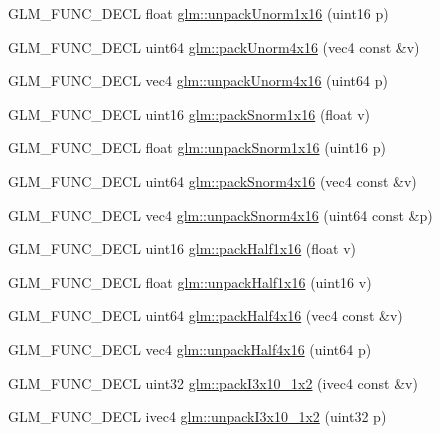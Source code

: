 \begin{DoxyCompactItemize}
G\-L\-M\-\_\-\-F\-U\-N\-C\-\_\-\-D\-E\-C\-L float \hyperlink{group__gtc__packing_ga7770e3ade4f4764cc1b2eb42ac4ec188}{glm\-::unpack\-Unorm1x16} (uint16 p)
\item 
G\-L\-M\-\_\-\-F\-U\-N\-C\-\_\-\-D\-E\-C\-L uint64 \hyperlink{group__gtc__packing_gac561f06c908b7302537a8ef29fcb409e}{glm\-::pack\-Unorm4x16} (vec4 const \&v)
\item 
G\-L\-M\-\_\-\-F\-U\-N\-C\-\_\-\-D\-E\-C\-L vec4 \hyperlink{group__gtc__packing_gafb2b502bc406031a5618ce930139a9e3}{glm\-::unpack\-Unorm4x16} (uint64 p)
\item 
G\-L\-M\-\_\-\-F\-U\-N\-C\-\_\-\-D\-E\-C\-L uint16 \hyperlink{group__gtc__packing_gac29411d6c0f6ed0fe9f0396dfe92e0e8}{glm\-::pack\-Snorm1x16} (float v)
\item 
G\-L\-M\-\_\-\-F\-U\-N\-C\-\_\-\-D\-E\-C\-L float \hyperlink{group__gtc__packing_ga246f451cebf590726324f7a283e3d65e}{glm\-::unpack\-Snorm1x16} (uint16 p)
\item 
G\-L\-M\-\_\-\-F\-U\-N\-C\-\_\-\-D\-E\-C\-L uint64 \hyperlink{group__gtc__packing_ga9b237d7c66b7a71964e6d1f4dc06539f}{glm\-::pack\-Snorm4x16} (vec4 const \&v)
\item 
G\-L\-M\-\_\-\-F\-U\-N\-C\-\_\-\-D\-E\-C\-L vec4 \hyperlink{group__gtc__packing_gadb01fc0530f07beb509c89d97b6f4d20}{glm\-::unpack\-Snorm4x16} (uint64 const \&p)
\item 
G\-L\-M\-\_\-\-F\-U\-N\-C\-\_\-\-D\-E\-C\-L uint16 \hyperlink{group__gtc__packing_gaba534b320836a35372e00af5771dd1a2}{glm\-::pack\-Half1x16} (float v)
\item 
G\-L\-M\-\_\-\-F\-U\-N\-C\-\_\-\-D\-E\-C\-L float \hyperlink{group__gtc__packing_gaa6eebcdfc746584b7d1823f1d5344fed}{glm\-::unpack\-Half1x16} (uint16 v)
\item 
G\-L\-M\-\_\-\-F\-U\-N\-C\-\_\-\-D\-E\-C\-L uint64 \hyperlink{group__gtc__packing_ga8104f0b719b7792491f2b789a6dd6f96}{glm\-::pack\-Half4x16} (vec4 const \&v)
\item 
G\-L\-M\-\_\-\-F\-U\-N\-C\-\_\-\-D\-E\-C\-L vec4 \hyperlink{group__gtc__packing_gaea526d6491ad40401eac34803984bf27}{glm\-::unpack\-Half4x16} (uint64 p)
\item 
G\-L\-M\-\_\-\-F\-U\-N\-C\-\_\-\-D\-E\-C\-L uint32 \hyperlink{group__gtc__packing_ga032e18fa5bc5b8f3897104aeb2f1e195}{glm\-::pack\-I3x10\-\_\-1x2} (ivec4 const \&v)
\item 
G\-L\-M\-\_\-\-F\-U\-N\-C\-\_\-\-D\-E\-C\-L ivec4 \hyperlink{group__gtc__packing_ga08bcd34cf9c34701d658dd861ee6e300}{glm\-::unpack\-I3x10\-\_\-1x2} (uint32 p)
\item 

\end{DoxyCompactItemize}
